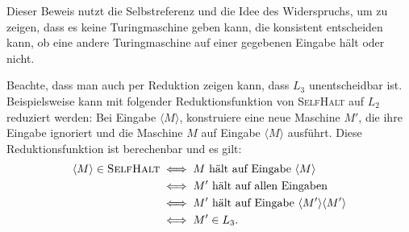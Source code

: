 \documentclass[a4paper,11pt,oneside,ngerman]{scrartcl}
\begin{document}
Dieser Beweis nutzt die Selbstreferenz und die Idee des Widerspruchs, um zu zeigen, dass es keine Turingmaschine geben kann, die konsistent entscheiden kann, ob eine andere Turingmaschine auf einer gegebenen Eingabe hält oder nicht.

Beachte, dass man auch per Reduktion zeigen kann, dass $L_3$ unentscheidbar ist.
Beispielsweise kann mit folgender Reduktionsfunktion von \textsc{SelfHalt} auf $L_2$ reduziert werden:
Bei Eingabe $\langle M \rangle$, konstruiere eine neue Maschine $M'$, die ihre Eingabe ignoriert und die Maschine $M$ auf Eingabe $\langle M \rangle$ ausführt.
Diese Reduktionsfunktion ist berechenbar und es gilt:
\begin{align*}
  \langle M \rangle \in \textsc{SelfHalt} &\iff M \text{ hält auf Eingabe } \langle M \rangle \\
  &\iff M' \text{ hält auf allen Eingaben} \\
  &\iff M' \text{ hält auf Eingabe } \langle M' \rangle \langle M' \rangle \\
  &\iff M' \in L_3.
\end{align*}
\end{document}

